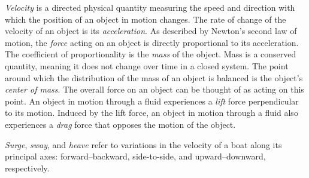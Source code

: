\documentclass[a4paper,landscape]{article}
\begin{document}
\small{
\emph{Velocity} is a directed physical quantity measuring the speed and direction with which the position of an object in motion changes.
The rate of change of the velocity of an object is its \emph{acceleration}.
As described by Newton's second law of motion, the \emph{force} acting on an object is directly proportional to its acceleration.
The coefficient of proportionality is the \emph{mass} of the object.
Mass is a conserved quantity, meaning it does not change over time in a closed system.
The point around which the distribution of the mass of an object is balanced is the object's \emph{center of mass}.
The overall force on an object can be thought of as acting on this point.
An object in motion through a fluid experiences a \emph{lift} force perpendicular to its motion.
Induced by the lift force, an object in motion through a fluid also experiences a \emph{drag} force that opposes the motion of the object.

\emph{Surge}, \emph{sway}, and \emph{heave} refer to variations in the velocity of a boat along its principal axes: forward--backward, side-to-side, and upward--downward, respectively.
}
\end{document}
